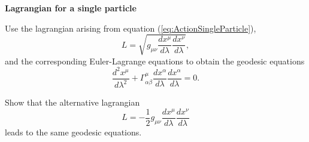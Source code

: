 \begin{exercise}
\textbf{Lagrangian for a single particle}

Use the lagrangian arising from equation (\ref{eq:ActionSingleParticle}),
\begin{equation}
L = \sqrt{g_{\mu \nu} \frac{dx^\mu}{d\lambda}\frac{dx^\nu}{d\lambda}},\label{eq:GRParticleLagrangian01}
\end{equation}
and the corresponding  Euler-Lagrange equations to obtain the geodesic equations
\begin{equation}
\frac{d^2 x^\mu}{d\lambda^2} + \Gamma^\mu_{\alpha \beta} \frac{dx^\alpha}{d\lambda} \frac{dx^\alpha}{d\lambda} =0. \label{eq:GeneralGeodesicEquations}
\end{equation}

Show that the alternative lagrangian 
\begin{equation}
L = -\frac{1}{2} g_{\mu \nu} \frac{dx^\mu}{d\lambda}\frac{dx^\nu}{d\lambda} \label{eq:GRParticleLagrangian}
\end{equation}
leads to the same geodesic equations.
\end{exercise}